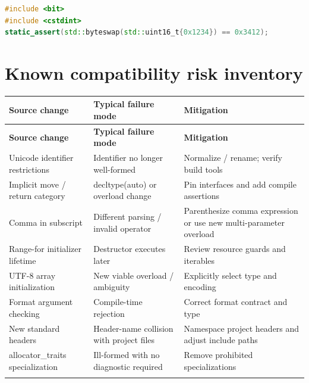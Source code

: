 \documentclass[11pt]{article}
\begin{document}
\begin{lstlisting}[language=C++]
#include <bit>
#include <cstdint>
static_assert(std::byteswap(std::uint16_t{0x1234}) == 0x3412);
\end{lstlisting}
\section{Known compatibility risk inventory}
\small
\begin{longtable}{@{}>{\raggedright\arraybackslash}p{.22\linewidth}>{\raggedright\arraybackslash}p{.34\linewidth}>{\raggedright\arraybackslash}p{}@{}}
\toprule
\textbf{Source change} & \textbf{Typical failure mode} & \textbf{Mitigation}\\
\midrule
\endfirsthead
\toprule
\textbf{Source change} & \textbf{Typical failure mode} & \textbf{Mitigation}\\
\midrule
\endhead
Unicode identifier restrictions & Identifier no longer well-formed & Normalize / rename; verify build tools\\
\addlinespace[2pt]
Implicit move / return category & decltype(auto) or overload change & Pin interfaces and add compile assertions\\
\addlinespace[2pt]
Comma in subscript & Different parsing / invalid operator & Parenthesize comma expression or use new multi-parameter overload\\
\addlinespace[2pt]
Range-for initializer lifetime & Destructor executes later & Review resource guards and iterables\\
\addlinespace[2pt]
UTF-8 array initialization & New viable overload / ambiguity & Explicitly select type and encoding\\
\addlinespace[2pt]
Format argument checking & Compile-time rejection & Correct format contract and type\\
\addlinespace[2pt]
New standard headers & Header-name collision with project files & Namespace project headers and adjust include paths\\
\addlinespace[2pt]
allocator\_traits specialization & Ill-formed with no diagnostic required & Remove prohibited specializations\\
\addlinespace[2pt]
\bottomrule
\end{longtable}
\normalsize
\end{document}
